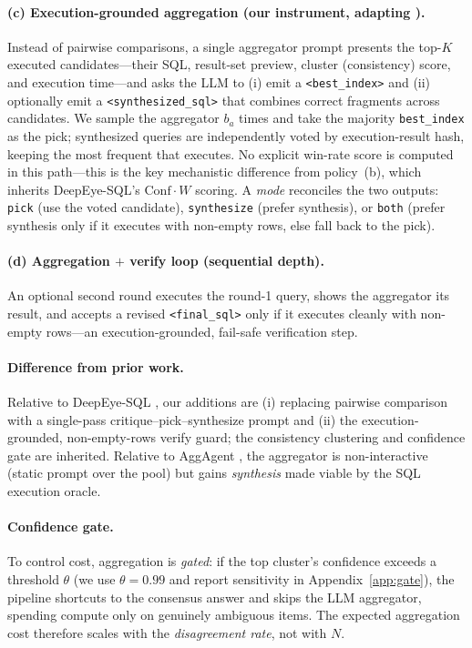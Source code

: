 \documentclass{article}
\begin{document}
\paragraph{(c) Execution-grounded aggregation (our instrument, adapting \citealp{lee2026aggagent}).}
Instead of pairwise comparisons, a single aggregator prompt presents the top-$K$ executed candidates---their SQL, result-set preview, cluster (consistency) score, and execution time---and asks the LLM to (i) emit a \texttt{<best\_index>} and (ii) optionally emit a \texttt{<synthesized\_sql>} that combines correct fragments across candidates. We sample the aggregator $b_a$ times and take the majority \texttt{best\_index} as the pick; synthesized queries are independently voted by execution-result hash, keeping the most frequent that executes. No explicit win-rate score is computed in this path---this is the key mechanistic difference from policy~(b), which inherits DeepEye-SQL's $\mathrm{Conf}\cdot W$ scoring. A \emph{mode} reconciles the two outputs: \texttt{pick} (use the voted candidate), \texttt{synthesize} (prefer synthesis), or \texttt{both} (prefer synthesis only if it executes with non-empty rows, else fall back to the pick).

\paragraph{(d) Aggregation $+$ verify loop (sequential depth).}
An optional second round executes the round-1 query, shows the aggregator its result, and accepts a revised \texttt{<final\_sql>} only if it executes cleanly with non-empty rows---an execution-grounded, fail-safe verification step.

\paragraph{Difference from prior work.}
Relative to DeepEye-SQL \citep{li2026deepeye}, our additions are (i) replacing pairwise comparison with a single-pass critique--pick--synthesize prompt and (ii) the execution-grounded, non-empty-rows verify guard; the consistency clustering and confidence gate are inherited. Relative to AggAgent \citep{lee2026aggagent}, the aggregator is non-interactive (static prompt over the pool) but gains \emph{synthesis} made viable by the SQL execution oracle.

\paragraph{Confidence gate.}
To control cost, aggregation is \emph{gated}: if the top cluster's confidence exceeds a threshold $\theta$ (we use $\theta\!=\!0.99$ and report sensitivity in Appendix~\ref{app:gate}), the pipeline shortcuts to the consensus answer and skips the LLM aggregator, spending compute only on genuinely ambiguous items. The expected aggregation cost therefore scales with the \emph{disagreement rate}, not with $N$.
\end{document}
